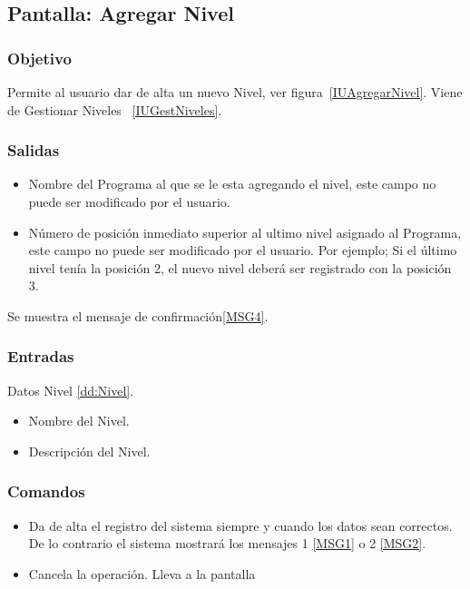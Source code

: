 \subsection{Pantalla: Agregar Nivel}

\subsubsection{Objetivo}
Permite al usuario dar de alta un nuevo Nivel, ver figura~\ref{IUAgregarNivel}. Viene de Gestionar Niveles ~\ref{IUGestNiveles}.


\subsubsection{Salidas}
\begin{itemize}
 \item Nombre del Programa al que se le esta agregando el nivel, este campo no puede ser modificado por el usuario.
 \item Número de posición inmediato superior al ultimo nivel asignado al Programa, este campo no puede ser modificado por el usuario. Por ejemplo; Si el último nivel tenía la posición 2, el nuevo nivel deberá ser registrado con la posición 3.
\end{itemize}
Se muestra el mensaje de confirmación\ref{MSG4}.

\subsubsection{Entradas}
Datos Nivel \ref{dd:Nivel}.
\begin{itemize}
 \item Nombre del Nivel.
 \item Descripción del Nivel.
\end{itemize}

\subsubsection{Comandos}
\begin{itemize}
 \item {} Da de alta el registro del sistema siempre y cuando los datos sean correctos. De lo contrario el sistema mostrará los mensajes 1 \ref{MSG1} o 2 \ref{MSG2}.
 \item {} Cancela la operación. Lleva a la pantalla 
\end{itemize}

